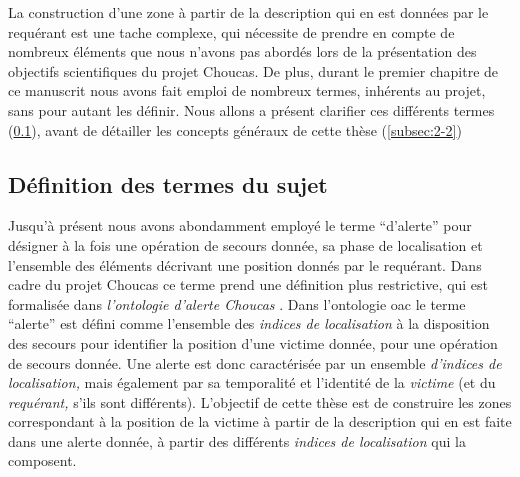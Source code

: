 La construction d'une zone à partir de la description qui en est
données par le requérant est une tache complexe, qui nécessite de
prendre en compte de nombreux éléments que nous n'avons pas abordés
lors de la présentation des objectifs scientifiques du projet
Choucas. De plus, durant le premier chapitre de ce manuscrit nous
avons fait emploi de nombreux termes, inhérents au projet, sans pour
autant les définir. Nous allons a présent clarifier ces différents
termes (\ref{subsec:2-1}), avant de détailler les concepts généraux de
cette thèse (\ref{subsec:2-2})

\subsection{Définition des termes du sujet}
\label{subsec:2-1}

Jusqu'à présent nous avons abondamment employé le terme
\enquote{d'alerte} pour désigner à la fois une opération de secours
donnée, sa phase de localisation et l'ensemble des éléments décrivant
une position donnés par le requérant. Dans cadre du projet Choucas ce
terme prend une définition plus restrictive, qui est formalisée dans
\emph{l’ontologie d'alerte Choucas}
\autocite[\ac{oac},][]{Viry2019}. Dans l'ontologie \ac{oac} le terme
\enquote{alerte} est défini comme l'ensemble des \emph{indices de
  localisation} à la disposition des secours pour identifier la
position d'une victime donnée, pour une opération de secours
donnée. Une alerte est donc caractérisée par un ensemble
\emph{d'indices de localisation,} mais également par sa temporalité et
l'identité de la \emph{victime} (et du \emph{requérant,} s'ils sont
différents). L'objectif de cette thèse est de construire les zones
correspondant à la position de la victime à partir de la description
qui en est faite dans une alerte donnée, \ie à partir des différents
\emph{indices de localisation} qui la composent.

